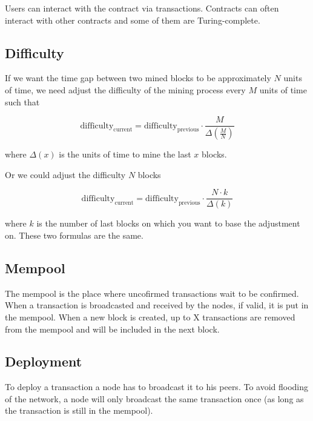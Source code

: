 \documentclass[../documentation.tex]{subfiles}
\begin{document}
Users can interact with the contract via transactions. Contracts can often interact with other contracts
and some of them are Turing-complete.

%
%

\subsection{Difficulty}

If we want the time gap between two mined blocks to be approximately
\(N\) units of time, we need adjust the difficulty of the mining process every 
\(M\) units of time such that

\[
    \text{difficulty}_\text{current} =
    \text{difficulty}_\text{previous}
    \cdot \frac{M}{\Delta (\frac{M}{N})}
\]

where \(\Delta (x)\) is the units of time to mine the last \(x\) blocks.

Or we could adjust the difficulty \(N\) blocks

\[
    \text{difficulty}_\text{current} =
    \text{difficulty}_\text{previous}
    \cdot \frac{N \cdot k}{\Delta(k)}
\]

where \(k\) is the number of last blocks on which you want to
base the adjustment on. These two formulas are the same.

\subsection{Mempool}

The mempool is the place where uncofirmed transactions
wait to be confirmed.
When a transaction is broadcasted and received by the nodes,
if valid, it is put in the mempool.
When a new block is created, up to X transactions are removed from the
mempool and will be included in the next block.

\subsection{Deployment}

To deploy a transaction a node has to broadcast it to his peers.
To avoid flooding of the network, a node will only broadcast
the same transaction once (as long as the transaction is still in the mempool).
\end{document}
